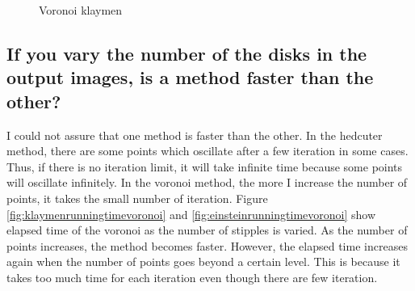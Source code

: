 \documentclass[11pt]{article}
\begin{document}
	\begin{figure}[ht] 
	\begin{center} 
		\hspace{5mm}
		\hspace{5mm}
		\hspace{5mm}
	\caption{Voronoi klaymen} 
	\label{fig:varydiskvoronoi}
	\end{center} 
	\end{figure}
\clearpage

\subsection{If you vary the number of the disks in the output images, is a method faster than the other?}%
I could not assure that one method is faster than the other. In the hedcuter method, there are some points which oscillate after a few iteration in some cases. Thus, if there is no iteration limit, it will take infinite time because some points will oscillate infinitely. In the voronoi method, the more I increase the number of points, it takes the small number of iteration. Figure \ref{fig:klaymenrunningtimevoronoi} and \ref{fig:einsteinrunningtimevoronoi} show elapsed time of the voronoi as the number of stipples is varied. As the number of points increases, the method becomes faster. However, the elapsed time increases again when the number of points goes beyond a certain level. This is because it takes too much time for each iteration even though there are few iteration.
\end{document}
